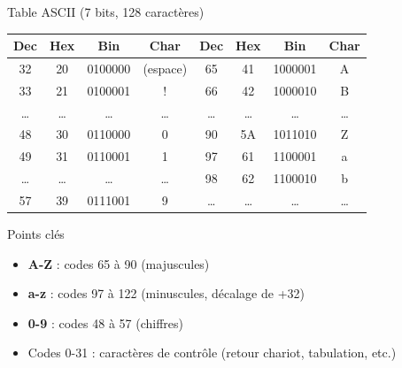 \documentclass[aspectratio=1610]{beamer}
\begin{document}
\begin{frame}{Table ASCII (7 bits, 128 caractères)}

  \begin{center}
    \small
    \begin{tabular}{|c|c|c|c||c|c|c|c|}
      \hline
      \textbf{Dec} & \textbf{Hex} & \textbf{Bin} & \textbf{Char} & \textbf{Dec} & \textbf{Hex} & \textbf{Bin} & \textbf{Char} \\
      \hline
      32 & 20 & 0100000 & (espace) & 65 & 41 & 1000001 & A \\
      33 & 21 & 0100001 & ! & 66 & 42 & 1000010 & B \\
      \ldots & \ldots & \ldots & \ldots & \ldots & \ldots & \ldots & \ldots \\
      48 & 30 & 0110000 & 0 & 90 & 5A & 1011010 & Z \\
      49 & 31 & 0110001 & 1 & 97 & 61 & 1100001 & a \\
      \ldots & \ldots & \ldots & \ldots & 98 & 62 & 1100010 & b \\
      57 & 39 & 0111001 & 9 & \ldots & \ldots & \ldots & \ldots \\
      \hline
    \end{tabular}
  \end{center}

  \vspace{0.3cm}

  \begin{exampleblock}{Points clés}
    \begin{itemize}
      \item \textbf{A-Z} : codes 65 à 90 (majuscules)
      \item \textbf{a-z} : codes 97 à 122 (minuscules, décalage de +32)
      \item \textbf{0-9} : codes 48 à 57 (chiffres)
      \item Codes 0-31 : caractères de contrôle (retour chariot, tabulation, etc.)
    \end{itemize}
  \end{exampleblock}

\end{frame}
\end{document}
